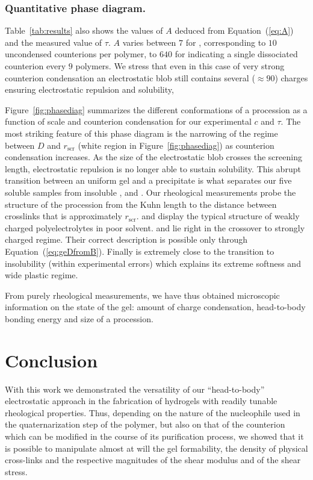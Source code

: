 \documentclass[twoside,twocolumn,9pt]{article}
\begin{document}
\subsubsection{Quantitative phase diagram.}

Table~\ref{tab:results} also shows the values of $A$ deduced from Equation~(\ref{eq:A}) and the measured value of $\tau$. $A$ varies between $7$ for , corresponding to $10$ uncondensed counterions per polymer, to $640$ for  indicating a single dissociated counterion every $9$ polymers. We stress that even in this case of very strong counterion condensation an electrostatic blob still contains several ($\approx 90$) charges ensuring electrostatic repulsion and solubility,

Figure~\ref{fig:phasediag} summarizes the different conformations of a procession as a function of scale and counterion condensation for our experimental $c$ and $\tau$. The most striking feature of this phase diagram is the narrowing of the regime between $D$ and $r_\mathrm{scr}$ (white region in Figure~\ref{fig:phasediag}) as counterion condensation increases. As the size of the electrostatic blob crosses the screening length, electrostatic repulsion is no longer able to sustain solubility. This abrupt transition between an uniform gel and a precipitate is what separates our five soluble samples from insoluble ,  and . Our rheological measurements probe the structure of the procession from the Kuhn length to the distance between crosslinks that is approximately $r_\mathrm{scr}$.  and  display the typical structure of weakly charged polyelectrolytes in poor solvent.  and  lie right in the crossover to strongly charged regime. Their correct description is possible only through Equation~(\ref{eq:geDfromB}). Finally  is extremely close to the transition to insolubility (within experimental errors) which explains its extreme softness and wide plastic regime.

From purely rheological measurements, we have thus obtained microscopic information on the state of the gel: amount of charge condensation, head-to-body bonding energy and size of a procession.




\section{Conclusion}
With this work we demonstrated the versatility of our ``head-to-body'' electrostatic approach in the fabrication of hydrogels with readily tunable rheological properties. Thus, depending on the nature of the nucleophile used in the quaternarization step of the polymer, but also on that of the counterion which can be modified in the course of its purification process, we showed that it is possible to manipulate almost at will the gel formability, the density of physical cross-links and the respective magnitudes of the shear modulus and of the shear stress. 
\end{document}
